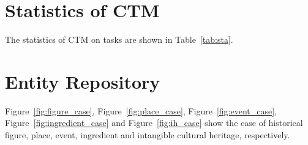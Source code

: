 \section{Statistics of CTM}
The statistics of CTM on tasks are shown in Table~\ref{tab:sta}.
\begin{table}[ht]
\centering
\caption{ 
The statistics of CTM.}
\tiny
\setlength\tabcolsep{6pt}
\label{tab:sta}
\end{table}


\section{Entity Repository}
Figure~\ref{fig:figure_case}, Figure~\ref{fig:place_case}, Figure~\ref{fig:event_case}, Figure~\ref{fig:ingredient_case} and Figure~\ref{fig:ih_case} show the case of historical figure, place, event, ingredient and intangible cultural heritage, respectively.


